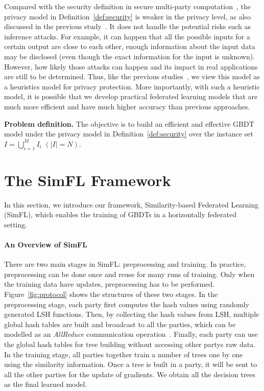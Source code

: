\documentclass[letterpaper]{article} %
\theoremstyle{definition}
\begin{document}
Compared with the security definition in secure multi-party computation~\cite{yao1982protocols}, the privacy model in Definition~\ref{def:security} is weaker in the privacy level, as also discussed in the previous study~\cite{du2004privacy}. It does not handle the potential risks such as inference attacks. For example, it can happen that all the possible inputs for a certain output are close to each other, enough information about the input data may be disclosed (even though the exact information for the input is unknown). However, how likely those attacks can happen and its impact in real applications are still to be determined. Thus, like the previous studies~\cite{du2004privacy,liu2018secure}, we view this model as a heuristics model for privacy protection. More importantly, with such a heuristic model, it is possible that we develop practical federated learning models that are much more efficient and have much higher accuracy than previous approaches.

{\bf Problem definition.} The objective is to build an efficient and effective GBDT model under the privacy model in Definition~\ref{def:security} over the instance set $I = \bigcup_{i=1}^MI_i$ $(|I|=N)$.

\section{The SimFL Framework}
In this section, we introduce our framework, Similarity-based Federated Learning (SimFL), which enables the training of GBDTs in a horizontally federated setting.

\paragraph{An Overview of SimFL}
There are two main stages in SimFL: preprocessing and training. In practice, preprocessing can be done once and reuse for many runs of training. Only when the training data have updates, preprocessing has to be performed. Figure~\ref{fig:protocol} shows the structures of these two stages.
In the preprocessing stage, each party first computes the hash values using randomly generated LSH functions. Then, by collecting the hash values from LSH, multiple global hash tables are built and broadcast to all the parties, which can be modelled as an \emph{AllReduce} communication operation~\cite{patarasuk2009bandwidth}. Finally, each party can use the global hash tables for tree building without accessing other partys raw data.
In the training stage, all parties together train a number of trees one by one using the similarity information. Once a tree is built in a party, it will be sent to all the other parties for the update of gradients. We obtain all the decision trees as the final learned model.
\end{document}
